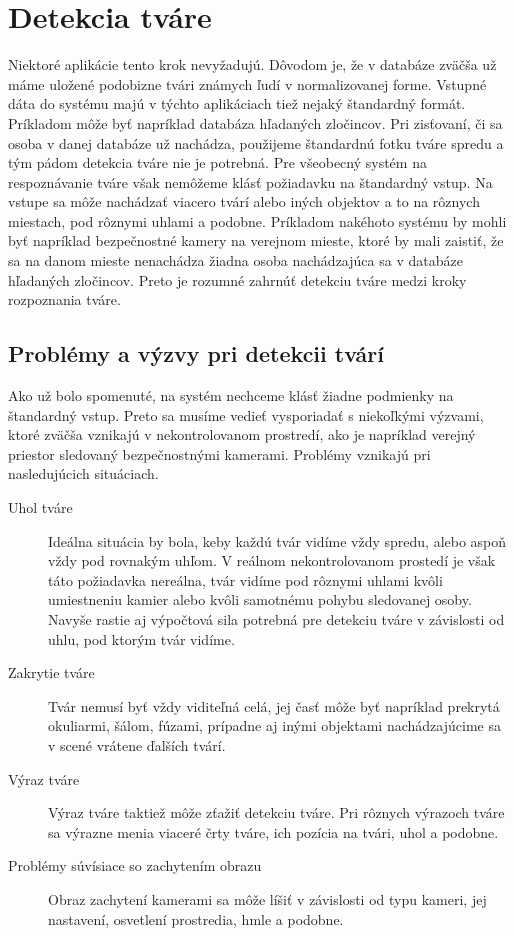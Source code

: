 \section{Detekcia tváre}
Niektoré aplikácie tento krok nevyžadujú. 
Dôvodom je, že v databáze zväčša už máme uložené podobizne tvári známych ľudí v normalizovanej forme.
Vstupné dáta do systému majú v týchto aplikáciach tiež nejaký štandardný formát. 
Príkladom môže byť napríklad databáza hľadaných zločincov. 
Pri zisťovaní, či sa osoba v danej databáze už nachádza, použijeme štandardnú fotku tváre spredu a tým pádom detekcia tváre nie je potrebná.
Pre všeobecný systém na respoznávanie tváre však nemôžeme klásť požiadavku na štandardný vstup.
Na vstupe sa môže nachádzať viacero tvárí alebo iných objektov a to na rôznych miestach, pod rôznymi uhlami a podobne.
Príkladom nakéhoto systému by mohli byť napríklad bezpečnostné kamery na verejnom mieste, ktoré by mali zaistiť, že sa na danom mieste nenachádza žiadna osoba nachádzajúca sa v databáze hľadaných zločincov.
Preto je rozumné zahrnúť detekciu tváre medzi kroky rozpoznania tváre.

\subsection{Problémy a výzvy pri detekcii tvárí}
Ako už bolo spomenuté, na systém nechceme klásť žiadne podmienky na štandardný vstup.
Preto sa musíme vedieť vysporiadať s niekoľkými výzvami, ktoré zväčša vznikajú v nekontrolovanom prostredí, ako je napríklad verejný priestor sledovaný bezpečnostnými kamerami.
Problémy vznikajú pri nasledujúcich situáciach.

\begin{description}
  \item[Uhol tváre] 
  Ideálna situácia by bola, keby každú tvár vidíme vždy spredu, alebo aspoň vždy pod rovnakým uhľom. 
  V reálnom nekontrolovanom prostedí je však táto požiadavka nereálna, tvár vidíme pod rôznymi uhlami kvôli umiestneniu kamier alebo kvôli samotnému pohybu sledovanej osoby.
  Navyše rastie aj výpočtová sila potrebná pre detekciu tváre v závislosti od uhlu, pod ktorým tvár vidíme.
  \item[Zakrytie tváre] Tvár nemusí byť vždy viditeľná celá, jej časť môže byť napríklad prekrytá okuliarmi, šálom, fúzami, prípadne aj inými objektami nachádzajúcime sa v scené vrátene ďalších tvárí.
  \item[Výraz tváre] Výraz tváre taktiež môže zťažiť detekciu tváre. Pri rôznych výrazoch tváre sa výrazne menia viaceré črty tváre, ich pozícia na tvári, uhol a podobne.
  \item[Problémy súvísiace so zachytením obrazu] Obraz zachytení kamerami sa môže líšiť v závislosti od typu kameri, jej nastavení, osvetlení prostredia, hmle a podobne.
\end{description}

